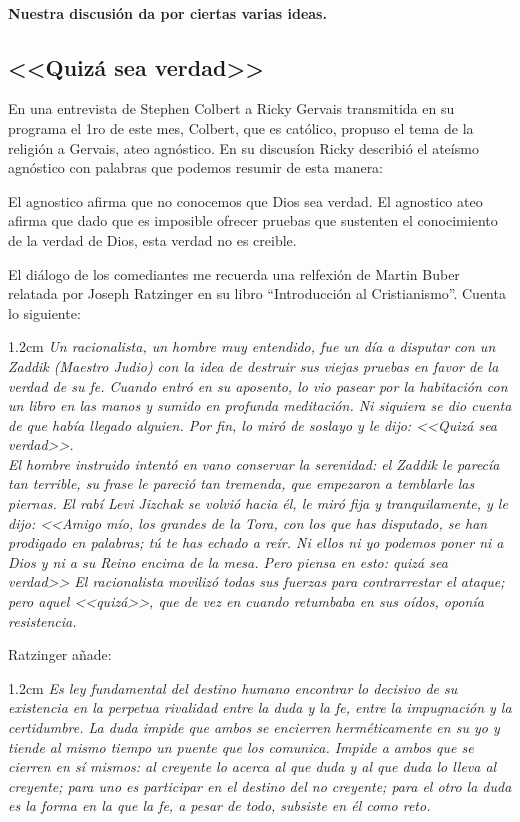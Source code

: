 \documentclass[10pt]{article}
\newcommand{\citalitlar}[1]{
\begin{adjustwidth}{1.2cm}{}
\emph{#1}
\end{adjustwidth}
}
\begin{document}
  \paragraph{Nuestra discusión da por ciertas varias ideas.\\}

  \subsection{<<Quizá sea verdad>>}
  En una entrevista de Stephen Colbert a Ricky Gervais transmitida en su programa
  el 1ro de este mes, Colbert, que es católico, propuso el tema de la religión a
  Gervais, ateo agnóstico. En su discusíon Ricky describió el ateísmo agnóstico
  con palabras que podemos resumir de esta manera:

  El agnostico afirma que no conocemos que Dios sea verdad. El agnostico ateo
  afirma que dado que es imposible ofrecer pruebas que sustenten el conocimiento
  de la verdad de Dios, esta verdad no es creible.

  El diálogo de los comediantes me recuerda una relfexión de Martin Buber relatada
  por Joseph Ratzinger en su libro ``Introducción al Cristianismo''. Cuenta lo
  siguiente:

  \citalitlar{Un racionalista, un hombre muy entendido, fue un día a disputar con
    un Zaddik (Maestro Judio) con la idea de destruir sus viejas pruebas en favor
    de la verdad de su fe. Cuando entró en su aposento, lo vio pasear por la
    habitación con un libro en las manos y sumido en profunda meditación. Ni
    siquiera se dio cuenta de que había
    llegado alguien. Por fin, lo miró de soslayo y le dijo: <<Quizá sea verdad>>.\\
    El hombre instruido intentó en vano conservar la serenidad: el Zaddik le
    parecía tan terrible, su frase le pareció tan tremenda, que empezaron a
    temblarle las piernas. El rabí Levi Jizchak se volvió hacia él, le miró fija y
    tranquilamente, y le dijo: <<Amigo mío, los grandes de la Tora, con los que
    has disputado, se han prodigado en palabras; tú te has echado a reír. Ni ellos
    ni yo podemos poner ni a Dios y ni a su Reino encima de la mesa. Pero piensa
    en esto: quizá sea verdad>> El racionalista movilizó todas sus fuerzas para
    contrarrestar el ataque; pero aquel <<quizá>>, que de vez en cuando retumbaba
    en sus oídos, oponía resistencia.}
    
  Ratzinger añade:
  \citalitlar{Es ley fundamental del destino humano encontrar lo decisivo de su
    existencia en la perpetua rivalidad entre la duda y la fe, entre la
    impugnación y la certidumbre. La duda impide que ambos se encierren
    herméticamente en su yo y tiende al mismo tiempo un puente que los comunica.
    Impide a ambos que se cierren en sí mismos: al creyente lo acerca al que duda
    y al que duda lo lleva al creyente; para uno es participar en el destino del
    no creyente; para el otro la duda es la forma en la que la fe, a pesar de
    todo, subsiste en él como reto.}
\end{document}
